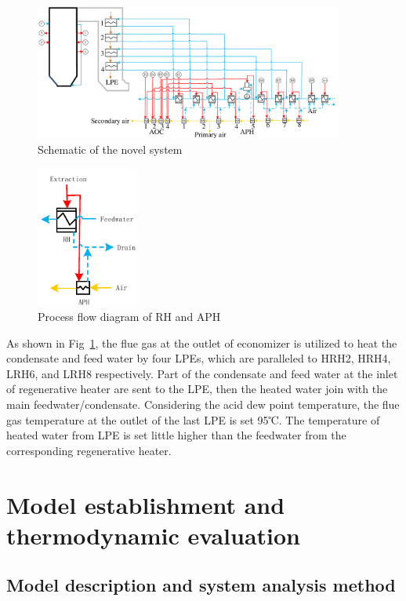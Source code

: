 \documentclass[preprint,12pt]{elsarticle}
\begin{document}
\begin{figure}[htbp]
\centering
\includegraphics[width=0.9\textwidth]{fig/novel_system}
\caption{Schematic of the novel system} 
\label{fig:novel_system}
\end{figure}

\begin{figure}[htbp]
\centering
\includegraphics[width=0.3\textwidth]{fig/extraction_heat_APH}
\caption{Process flow diagram of RH and APH} 
\label{fig:extraction_heat_APH}
\end{figure}
As shown in Fig~\ref{fig:novel_system}, the flue gas at the outlet of economizer is utilized to heat the condensate and feed water by four LPEs, which are paralleled to HRH2, HRH4, LRH6, and LRH8 respectively. 
Part of the condensate and feed water at the inlet of regenerative heater are sent to the LPE, then the heated water join with the main feedwater/condensate. 
Considering the acid dew point temperature, the flue gas temperature at the outlet of the last LPE is set 95℃. 
The temperature of heated water from LPE is set little higher than the feedwater from the corresponding regenerative heater.%

\section{Model establishment and thermodynamic evaluation} %
\label{sec3:modle est and eval}
\subsection{Model description and system analysis method} %
\label{ssub:model_establishment_and_system_analysis_method}
\end{document}
